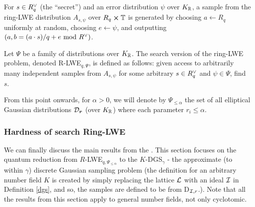 
\begin{definition}
	For $s \in R^{\vee}_q$ (the ``secret'') and an error distribution $\psi$ over $K_{\mathbb{R}}$, a sample from the ring-LWE distribution $A_{s, \psi}$ over $R_q \cross \mathbb{T}$ is generated by choosing $a \leftarrow R_q$ uniformly at random, choosing $e \leftarrow \psi$, and outputting $(a, b = (a \cdot s)/q + e \text{ mod } R^{\vee})$.
\end{definition}
\begin{definition}
	Let $\Psi$ be a family of distributions over $K_{\mathbb{R}}$. The search version of the ring-LWE problem, denoted R-LWE$_{q, \Psi}$, is defined as follows: given access to arbitrarily many independent samples from $A_{s, \psi}$ for some arbitrary $s \in R^{\vee}_q$ and $\psi \in \Psi$, find $s$.
\end{definition}
From this point onwards, for $\alpha > 0$, we will denote by $\Psi_{\leq \alpha}$ the set of all elliptical Gaussian distributions $\mathcal{D}_{\boldsymbol{r}}$ (over $K_{\mathbb{R}}$) where each parameter $r_i \leq \alpha$.
\subsubsection{Hardness of search Ring-LWE}\label{h-rlwe}
We can finally discuss the main results from the \cite{ring-lwe}. This section focuses on the quantum reduction from $R$-LWE$_{q, \Psi_{\leq \alpha}}$ to the $K$-DGS$_{\gamma}$ - the approximate (to within $\gamma$) discrete Gaussian sampling problem (the definition for an arbitrary number field $K$ is created by simply replacing the lattice $\mathcal{L}$ with an ideal $\mathcal{I}$ in Definition \ref{dgs}, and so, the samples are defined to be from D$_{\mathcal{I}, r}$.). Note that all the results from this section apply to general number fields, not only cyclotomic.

